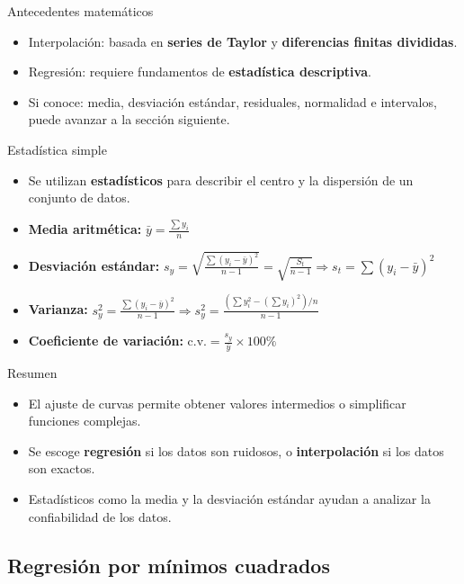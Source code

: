 \documentclass[main.tex]{subfiles}
\begin{document}
\begin{frame}{Antecedentes matemáticos}
\begin{itemize}
  \item Interpolación: basada en \textbf{series de Taylor} y \textbf{diferencias finitas divididas}.
  \item Regresión: requiere fundamentos de \textbf{estadística descriptiva}.
  \item Si conoce: media, desviación estándar, residuales, normalidad e intervalos, puede avanzar a la sección siguiente.
\end{itemize}
\end{frame}

\begin{frame}{Estadística simple}
\begin{itemize}
  \item Se utilizan \textbf{estadísticos} para describir el centro y la dispersión de un conjunto de datos.
  \item \textbf{Media aritmética:} $\bar{y} = \frac{\sum y_i}{n}$
  \item \textbf{Desviación estándar:} $s_y = \sqrt{\frac{\sum (y_i - \bar{y})^2}{n-1}}   = \sqrt{\frac{S_t}{n-1}}  \Rightarrow s_t=\sum(y_i-\bar{y})^2$
  \item \textbf{Varianza:} $s_y^2  = \frac{\sum (y_i - \bar{y})^2}{n-1} \Rightarrow  s_y^2  = \frac{(\sum y_i^2 - (\sum{y_i})^2)/n}{n-1} $ 
  \item \textbf{Coeficiente de variación:} $\text{c.v.} = \frac{s_y}{\bar{y}} \times 100\%$
\end{itemize}
\end{frame}


\begin{frame}{Resumen}
\begin{itemize}
  \item El ajuste de curvas permite obtener valores intermedios o simplificar funciones complejas.
  \item Se escoge \textbf{regresión} si los datos son ruidosos, o \textbf{interpolación} si los datos son exactos.
  \item Estadísticos como la media y la desviación estándar ayudan a analizar la confiabilidad de los datos.
\end{itemize}
\end{frame}

\subsection{Regresión por mínimos cuadrados}
\end{document}
